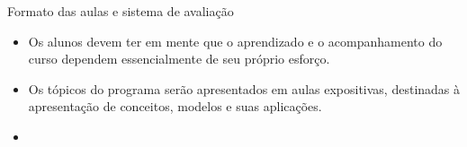 \documentclass[10pt]{beamer}
\begin{document}
\begin{frame}{Formato das aulas e sistema de avaliação}
    \begin{itemize}
        \item Os alunos devem ter em mente que o aprendizado e o acompanhamento do curso dependem essencialmente de seu próprio esforço.\bigskip

        \item Os tópicos do programa serão apresentados em aulas expositivas, destinadas à apresentação de conceitos, modelos e suas aplicações.\bigskip

        \item[\emoji{warning}] 
    \end{itemize}

\end{frame}
\end{document}
